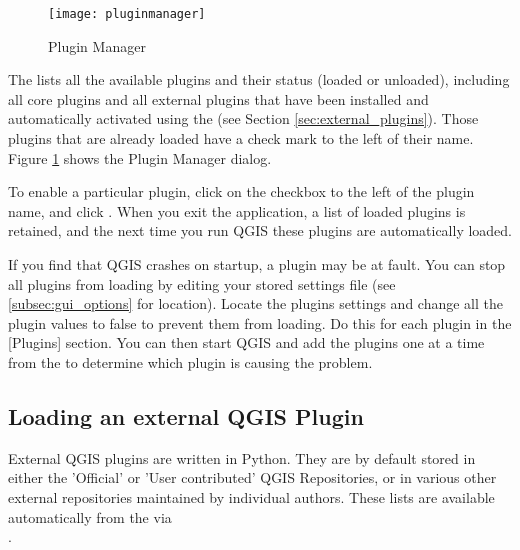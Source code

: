 \begin{figure}[ht]
   \centering
   \texttt{[image: pluginmanager]}
   \caption{Plugin Manager \nixcaption}\label{fig:pluginmanager}\smallskip
\end{figure}

The  lists all the available plugins and their
status (loaded or unloaded), including all core plugins and all external
plugins that have been installed and automatically activated using the
 (see Section \ref{sec:external_plugins}).
Those plugins that are already loaded have a check mark to the left of
their name. Figure \ref{fig:pluginmanager} shows the Plugin Manager dialog.

To enable a particular plugin, click on the checkbox to the left of the
plugin name, and click . When you exit the application, a list
of loaded plugins is retained, and the next time you run QGIS these
plugins are automatically loaded.

\begin{Tip}\caption{\textsc{Crashing Plugins}}
If you find that QGIS crashes on startup, a plugin may be at fault.
You can stop all plugins from loading by editing your stored settings file
(see \ref{subsec:gui_options} for location). Locate the plugins settings and
change all the plugin values to false to prevent them from loading.
\normalfont
Do this for each plugin in the [Plugins] section. You can then start QGIS
and add the plugins one at a time from the  to
determine which plugin is causing the problem.
\end{Tip}

\subsection{Loading an external QGIS Plugin}\label{sec:load_external_plugin}

External QGIS plugins are written in Python. They are by default stored in either 
the 'Official' or 'User contributed' QGIS Repositories, or in various other external
repositories maintained by individual authors. These lists are available 
automatically from the  via \\
.

